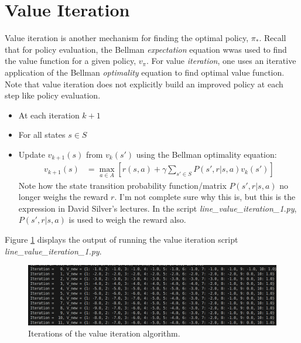 \documentclass[a4paper,11pt]{article}
\begin{document}
\section{Value Iteration}

Value iteration is another mechanism for finding the optimal policy, $\pi_{\ast}$.  Recall that for policy evaluation, the Bellman {\it expectation} equation wwas used to find the value function for a given policy, $v_{\pi}$.  For value {\it iteration}, one uses an iterative application of the Bellman {\it optimality} equation to find optimal value function.  Note that value iteration does not explicitly build an improved policy at each step like policy evaluation.

\begin{itemize}
    \item At each iteration $k+1$
    \item For all states $s \in S$
    \item Update $v_{k+1}(s)$ from $v_{k}(s')$ using the Bellman optimality equation:
    \begin{equation} \label{eqn:Bellman_optimality_eqn}
    \begin{split}
        v_{k+1} (s) &= \max_{a \in A} \left[ r(s,a) + \gamma \sum_{s' \in S} P(s', r|s,a) v_k(s') \right]
    \end{split}
    \end{equation}
    Note how the state transition probability function/matrix $P(s',r|s,a)$ no longer weighs the reward $r$.  I'm not complete sure why this is, but this is the expression in David Silver's lectures.  In the script {\it line\_value\_iteration\_1.py}, $P(s',r|s,a)$ is used to weigh the reward also.
\end{itemize}

Figure \ref{fig:iters-of-value-iteration-1d-grid-world-code-output} displays the output of running the value iteration script {\it line\_value\_iteration\_1.py}.

\begin{figure}
    \includegraphics[width=\textwidth]{images/iters-of-value-iteration-1d-grid-world-code-output.png}
    \caption{Iterations of the value iteration algorithm.}
    \label{fig:iters-of-value-iteration-1d-grid-world-code-output}
\end{figure}
\end{document}
